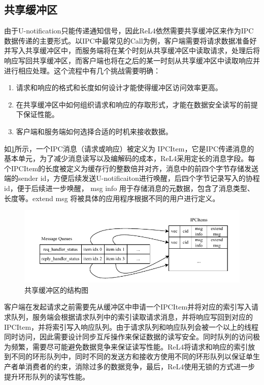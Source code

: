 \subsection{共享缓冲区}
由于U-notification只能传递通知信号，因此ReL4依然需要共享缓冲区来作为IPC数据传递的主要形式。以IPC中最常见的Call为例，客户端需要将请求数据准备好并写入共享缓冲区中，而服务端将在某个时刻从共享缓冲区中读取请求，处理后将响应写回共享缓冲区，而客户端也将在之后的某一时刻从共享缓冲区中读取响应并进行相应处理。这个流程中有几个挑战需要明确：
\begin{enumerate}
  \item 请求和响应的格式和长度如何设计才能使得缓冲区访问效率更高。
  \item 在共享缓冲区中如何组织请求和响应的存取形式，才能在数据安全读写的前提下保证性能。
  \item 客户端和服务端如何选择合适的时机来接收数据。
\end{enumerate}

如\ref{fig:ipcitem}所示，一个IPC消息（请求或响应）被定义为 IPCItem，它是IPC传递消息的基本单元，为了减少消息读写以及编解码的成本，ReL4采用定长的消息字段。每个IPCItem的长度被定义为缓存行的整数倍并对齐，消息中的前四个字节存储发送端的sender id，方便后续发送U-notificaiton进行唤醒，后四个字节记录写入的协程id，便于后续进一步唤醒， msg info 用于存储消息的元数据，包含了消息类型、长度等。extend msg 将被具体的应用程序根据不同的用户进行定义。

\begin{figure}[htbp]
  \centering
  \includegraphics[width=1.0\textwidth]{figures/IPCItem.drawio.pdf}
  \caption{共享缓冲区的结构图}\label{fig:ipcitem}
\end{figure}

客户端在发起请求之前需要先从缓冲区中申请一个IPCItem并将对应的索引写入请求队列，服务端会根据请求队列中的索引读取请求消息，并将响应写回到对应的IPCItem，并将索引写入响应队列。由于请求队列和响应队列会被一个以上的线程同时访问，因此需要设计同步互斥操作来保证数据的读写安全。同时队列的访问极为频繁，需要尽可能避免数据竞争来保证读写性能。ReL4将请求和响应的索引放到不同的环形队列中，同时不同的发送方和接收方使用不同的环形队列以保证单生产者单消费者的约束，消除过多的数据竞争，最后，ReL4使用无锁的方式\cite{barnes1993method}进一步提升环形队列的读写性能。

